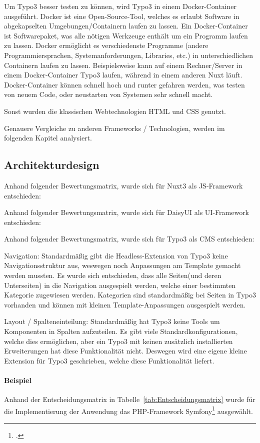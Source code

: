 Um Typo3 besser testen zu können, wird Typo3 in einem Docker-Container ausgeführt. Docker ist eine Open-Source-Tool, welches es erlaubt Software in abgekapselten Umgebungen/Containern laufen zu lassen. Ein Docker-Container ist Softwarepaket, was alle nötigen Werkzeuge enthält um ein Programm laufen zu lassen. Docker ermöglicht es verschiedenste Programme (andere Programmiersprachen, Systemanforderungen, Libraries, etc.) in unterschiedlichen Containern laufen zu lassen. Beispielsweise kann auf einem Rechner/Server in einem Docker-Container Typo3 laufen, während in einem anderen Nuxt läuft. Docker-Container können schnell hoch und runter gefahren werden, was testen von neuem Code, oder neustarten von Systemen sehr schnell macht.


Sonst wurden die klassischen Webtechnologien HTML und CSS genutzt.

Genauere Vergleiche zu anderen Frameworks / Technologien, werden im folgenden Kapitel analysiert.

\subsection{Architekturdesign}
\label{sec:Architekturdesign}

Anhand folgender Bewertungsmatrix, wurde sich für Nuxt3 als JS-Framework entschieden:

Anhand folgender Bewertungsmatrix, wurde sich für DaisyUI als UI-Framework entschieden:

Anhand folgender Bewertungsmatrix, wurde sich für Typo3 als CMS entschieden:

Navigation: Standardmäßig gibt die Headless-Extension von Typo3 keine Navigationsstruktur aus, weswegen noch Anpassungen am Template gemacht werden mussten. Es wurde sich entschieden, dass alle Seiten(und deren Unterseiten) in die Navigation ausgespielt werden, welche einer bestimmten Kategorie zugewiesen werden. Kategorien sind standardmäßig bei Seiten in Typo3 vorhanden und können mit kleinen Template-Anpassungen ausgespielt werden.

Layout / Spalteneinteilung: Standardmäßig hat Typo3 keine Tools um Komponenten in Spalten aufzuteilen. Es gibt viele Standardkonfigurationen, welche dies ermöglichen, aber ein Typo3 mit keinen zusätzlich installierten Erweiterungen hat diese Funktionalität nicht. Deswegen wird eine eigene kleine Extension für Typo3 geschrieben, welche diese Funktionalität liefert.

\paragraph{Beispiel}
Anhand der Entscheidungsmatrix in Tabelle~\ref{tab:Entscheidungsmatrix} wurde für die Implementierung der Anwendung das \acs{PHP}-Framework Symfony\footnote{\Vgl \citet{Symfony}.} ausgewählt. 

